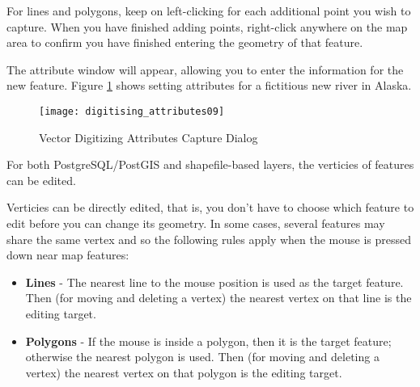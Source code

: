 For lines and polygons, keep on left-clicking for each additional
point you wish to capture.  When you have finished adding points,
right-click anywhere on the map area to confirm you have finished entering
the geometry of that feature.

The attribute window will appear, allowing you to enter the information for the new feature.
Figure \ref{fig:vector_digitising} shows setting attributes for a fictitious
new river in Alaska.

\begin{figure}[ht]
   \begin{center}
   \caption{Vector Digitizing Attributes Capture
Dialog}\label{fig:vector_digitising}\smallskip
   \texttt{[image: digitising\_attributes09]}
\end{center}  
\end{figure}

\begin{Tip}[h]\caption{\textsc{Attribute Value Types}}
\end{Tip}



For both PostgreSQL/PostGIS and shapefile-based layers, the verticies of features
can be edited. 

Verticies can be directly edited, that is, you don't
have to choose which feature to edit before you can change
its geometry.
In some cases, several features may share the same vertex
and so the following rules apply when the mouse is pressed
down near map features:

\begin{itemize}
\item \textbf{Lines}    - The nearest line to the mouse position
                          is used as the target feature.
                          Then (for moving and deleting a vertex)
                          the nearest vertex
                          on that line is the editing target.

\item \textbf{Polygons} - If the mouse is inside a polygon, then it is
                          the target feature; otherwise the nearest polygon
                          is used.
                          Then (for moving and deleting a vertex)
                          the nearest vertex
                          on that polygon is the editing target.
\end{itemize}

